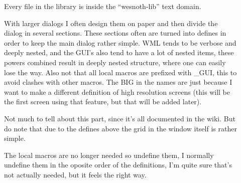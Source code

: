\begin{description}
	\begin{description}
	\item[]
		Every file in the library is inside the ``wesnoth-lib'' text domain.

	\item[]
		With larger dialogs I often design them on paper and then divide the
dialog in several sections. These sections often are turned into defines in
order to keep the main dialog rather simple. WML tends to be verbose and deeply
nested, and the GUI's also tend to have a lot of nested items, these powers
combined result in deeply nested structure, where one can easily lose the way.
Also not that all local macros are prefixed with \_GUI, this to avoid clashes
with other macros. The BIG in the names are just because I want to make a
different definition of high resolution screens (this will be the first screen
using that feature, but that will be added later).

	\item[]
		Not much to tell about this part, since it's all documented in the wiki.
But do note that due to the defines above the grid in the window itself is
rather simple.

	\item[]
		The local macros are no longer needed so undefine them, I normally
undefine them in the oposite order of the definitions, I'm quite sure that's not
actually needed, but it feels the right way\texttrademark.

	\end{description}

\end{description}

